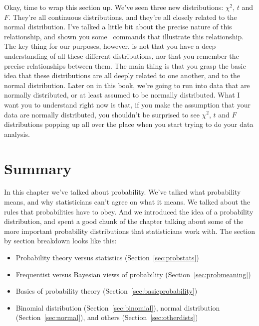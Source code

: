 Okay, time to wrap this section up. We've seen three new distributions: $\chi^2$, $t$ and $F$. They're all continuous distributions, and they're all closely related to the normal distribution. I've talked a little bit about the precise nature of this relationship, and shown you some \R\ commands that illustrate this relationship. The key thing for our purposes, however, is not that you have a deep understanding of all these different distributions, nor that you remember the precise relationships between them. The main thing is that you grasp the basic idea that these distributions are all deeply related to one another, and to the normal distribution. Later on in this book, we're going to run into data that are normally distributed, or at least assumed to be normally distributed. What I want you to understand right now is that, if you make the assumption that your data are normally distributed, you shouldn't be surprised to see $\chi^2$, $t$ and $F$ distributions popping up all over the place when you start trying to do your data analysis. 




\section{Summary}

In this chapter we've talked about probability. We've talked what probability means, and why statisticians can't agree on what it means. We talked about the rules that probabilities have to obey. And we introduced the idea of a probability distribution, and spent a good chunk of the chapter talking about some of the more important probability distributions that statisticians work with. The section by section breakdown looks like this:

\begin{itemize} \itemsep -2pt
\item Probability theory versus statistics (Section~\ref{sec:probstats})
\item Frequentist versus Bayesian views of probability (Section~\ref{sec:probmeaning})
\item Basics of probability theory (Section~\ref{sec:basicprobability})
\item Binomial distribution (Section~\ref{sec:binomial}), normal distribution (Section~\ref{sec:normal}), and others (Section~\ref{sec:otherdists})
\end{itemize}

